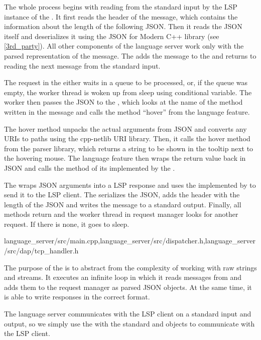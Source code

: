 The whole process begins with reading from the standard input by the LSP instance of the . It first reads the header of the message, which contains the information about the length of the following JSON. Then it reads the JSON itself and deserializes it using the JSON for Modern C++ library (see \cref{3rd_party}). All other components of the language server work only with the parsed representation of the message. The  adds the message to the  and returns to reading the next message from the standard input.

The request in the  either waits in a queue to be processed, or, if the queue was empty, the worker thread is woken up from sleep using conditional variable. The worker then passes the JSON to the , which looks at the name of the method written in the message and calls the method ``hover'' from the language feature.

The hover method unpacks the actual arguments from JSON and converts any URIs to paths using the cpp-netlib URI library. Then, it calls the hover method from the parser library, which returns a string to be shown in the tooltip next to the hovering mouse. The language feature then wraps the return value back in JSON and calls the  method of its  implemented by the .

The  wraps JSON arguments into a LSP response and uses the  implemented by  to send it to the LSP client. The  serializes the JSON, adds the header with the length of the JSON and writes the message to a standard output. Finally, all methods return and the worker thread in request manager looks for another request. If there is none, it goes to sleep.

{language\_server/src/main.cpp,language\_server/src/dispatcher.h,language\_server/src/dap/tcp\_handler.h}

The purpose of the  is to abstract from the complexity of working with raw strings and streams. It executes an infinite loop in which it reads messages from  and adds them to the request manager as parsed JSON objects. At the same time, it is able to write responses in the correct format.

The language server communicates with the LSP client on a standard input and output, so we simply use the  with the standard  and  objects to communicate with the LSP client.

